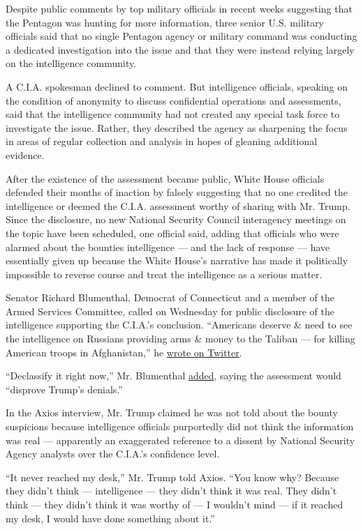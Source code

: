 Despite public comments by top military officials in recent weeks
suggesting that the Pentagon was hunting for more information, three
senior U.S. military officials said that no single Pentagon agency or
military command was conducting a dedicated investigation into the issue
and that they were instead relying largely on the intelligence
community.

A C.I.A. spokesman declined to comment. But intelligence officials,
speaking on the condition of anonymity to discuss confidential
operations and assessments, said that the intelligence community had not
created any special task force to investigate the issue. Rather, they
described the agency as sharpening the focus in areas of regular
collection and analysis in hopes of gleaning additional evidence.

After the existence of the assessment became public, White House
officials defended their months of inaction by falsely suggesting that
no one credited the intelligence or deemed the C.I.A. assessment worthy
of sharing with Mr. Trump. Since the disclosure, no new National
Security Council interagency meetings on the topic have been scheduled,
one official said, adding that officials who were alarmed about the
bounties intelligence --- and the lack of response --- have essentially
given up because the White House's narrative has made it politically
impossible to reverse course and treat the intelligence as a serious
matter.

Senator Richard Blumenthal, Democrat of Connecticut and a member of the
Armed Services Committee, called on Wednesday for public disclosure of
the intelligence supporting the C.I.A.'s conclusion. ``Americans deserve
\& need to see the intelligence on Russians providing arms \& money to
the Taliban --- for killing American troops in Afghanistan,'' he
\href{https://twitter.com/SenBlumenthal/status/1288495888587948037?s=20}{wrote
on Twitter}.

``Declassify it right now,'' Mr. Blumenthal
\href{https://twitter.com/SenBlumenthal/status/1288495889678512129?s=20}{added},
saying the assessment would ``disprove Trump's denials.''

In the Axios interview, Mr. Trump claimed he was not told about the
bounty suspicions because intelligence officials purportedly did not
think the information was real --- apparently an exaggerated reference
to a dissent by National Security Agency analysts over the C.I.A.'s
confidence level.

``It never reached my desk,'' Mr. Trump told Axios. ``You know why?
Because they didn't think --- intelligence --- they didn't think it was
real. They didn't think --- they didn't think it was worthy of --- I
wouldn't mind --- if it reached my desk, I would have done something
about it.''

